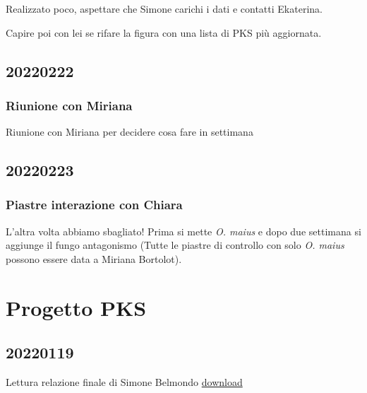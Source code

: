 \documentclass[
]{book}
\begin{document}
Realizzato poco, aspettare che Simone carichi i dati e contatti Ekaterina.

Capire poi con lei se rifare la figura con una lista di PKS più aggiornata.

\hypertarget{D20220222}{%
\section{20220222}\label{D20220222}}

\hypertarget{riunione-con-miriana}{%
\subsection{Riunione con Miriana}\label{riunione-con-miriana}}

Riunione con Miriana per decidere cosa fare in settimana

\hypertarget{D20220223}{%
\section{20220223}\label{D20220223}}

\hypertarget{piastre-interazione-con-chiara}{%
\subsection{Piastre interazione con Chiara}\label{piastre-interazione-con-chiara}}

L'altra volta abbiamo sbagliato! Prima si mette \emph{O. maius} e dopo due settimana si aggiunge il fungo antagonismo (Tutte le piastre di controllo con solo \emph{O. maius} possono essere data a Miriana Bortolot).

\hypertarget{progetto-pks}{%
\chapter{Progetto PKS}\label{progetto-pks}}

\hypertarget{section}{%
\section{20220119}\label{section}}

Lettura relazione finale di Simone Belmondo \href{Documents/Relazione_finale_Simone_Belmondo.pdf}{download}

  
\end{document}
